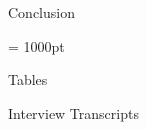 \documentclass[12pt]{article}
\begin{document}
 \begin{section}{Conclusion}
 
     
 
 \end{section}
 
 \clearpage
 \hfuzz = 1000pt
 \printbibliography
 
 \appendix
 \begin{section}{Tables}
     \label{Append:A}
    \clearpage
    \thispagestyle{empty}
     
    \clearpage
 \end{section}
 
 \begin{section}{Interview Transcripts}
     
 \end{section}

 
\end{document}

